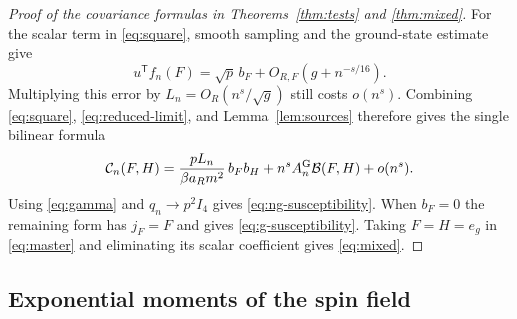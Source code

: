 \documentclass[11pt]{article}
\numberwithin{equation}{section}
\newcommand{\Cspin}{\mathcal C_n}
\begin{document}
\begin{proof}[Proof of the covariance formulas in Theorems~\ref{thm:tests} and \ref{thm:mixed}]
For the scalar term in \eqref{eq:square}, smooth sampling and the
ground-state estimate give
\begin{equation}
 u^{\mathsf T}f_n(F)=\sqrt p\, b_F+
                 O_{R,F}(g+n^{-s/16}).
\end{equation}
Multiplying this error by $L_n=O_R(n^s/\sqrt g)$ still costs
$o(n^s)$. Combining \eqref{eq:square}, \eqref{eq:reduced-limit}, and
Lemma~\ref{lem:sources} therefore gives the single bilinear formula
\begin{equation}
 \Cspin(F,H)=\frac{p L_n}{\beta a_R m^2}\,
        b_F b_H+n^s A_n^{\rm G}\mathcal B(F,H)+o(n^s).
 \label{eq:master}
\end{equation}
Using \eqref{eq:gamma} and $q_n\to p^2 I_4$ gives \eqref{eq:ng-susceptibility}.
When $b_F=0$ the remaining form has $j_F=F$ and gives
\eqref{eq:g-susceptibility}. Taking $F=H=e_g$ in \eqref{eq:master} and eliminating
its scalar coefficient gives \eqref{eq:mixed}.
\end{proof}

\subsection{Exponential moments of the spin field}
\end{document}
